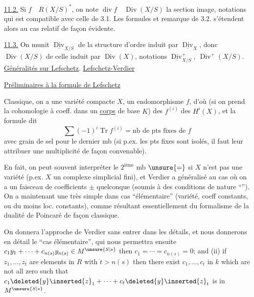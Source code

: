 \uline{11.2.} Si $f\quad R(X/S)^{\ast}$, on note $\operatorname{div}f\quad\operatorname{Div}(X/S)$ la section
image, notations qui est compatible avec celle de 3.1. Les
formules et remarque de 3.2. s'étendent alors au cas relatif
de façon évidente.

\uline{11.3.} On munit $\underline{\operatorname{Div}}_{X/S}$ de la structure d'ordre induit par
$\underline{\operatorname{Div}}_X$, donc $\operatorname{Div}(X/S)$ de celle induit par
$\operatorname{Div}(X)$, notations $\underline{\operatorname{Div}}_{X/S}^{+},\ \operatorname{Div}^{+}(X/S)$.
\uline{Généralités sur Lefschetz}. \uline{Lefschetz-Verdier}

\uline{Préliminaires à la formule de  Lefschetz}

Classique, on a une variété compacte $X$, un endomorphisme $f$, d'où (si on prend la cohomologie à coeff. dans un \uline{corps} de base $K$) des $f^{(i)}$ des $H^i(X)$, et la formule dit
\[
\sum(-1)^i\operatorname{Tr}f^{(i)}=\text{nb de pts fixes de }f
\]
avec grain de sel pour le dernier mb (si p.ex. les pts fixes sont isolés, il faut leur attribuer une multiplicité de façon convenable).

En fait, on peut souvent interpréter le $2^{\text{ième}}$ mb  $\unsure{=}$ si $X$ n'est pas une variété (p.ex. $X$ un complexe simplicial fini), et Verdier a généralisé  au cas où on a un faisceau de coefficients $\pm$ quelconque (soumis à des  conditions de nature ``''). On a maintenant une  très simple dans cas ``élémentaire'' (variété, coeff constants, ou du moins loc. constants), comme résultant  essentiellement du formalisme de la dualité de Poincaré de façon classique.

 On donnera l'approche de Verdier  sans entrer dans les détails, et nous  donnerons en détail le ``cas élémentaire'', qui nous permettra ensuite
$c_1y_1+\cdots+c_{n(s)}y_{n(s)}\in M^{\unsure{S|s}}$ then $c_1=\cdots=c_{n(s)}=0$; and (ii) if $z_1,\ldots,z_t$ are elements in $R$ with $t>n(s)$ then there exist $c_1,\ldots,c_t$ in $k$ which are not all zero such that $c_1\deleted{y}\inserted{z}_1+\cdots+c_t\deleted{y}\inserted{z}_t$ is in $M^{\unsure{S|s}}$.

